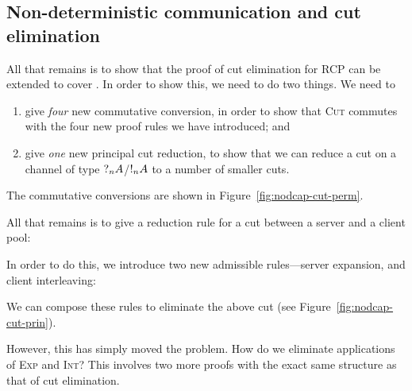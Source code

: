 \documentclass[a4paper,UKenglish]{lipics-v2016}
\begin{document}
\subsection*{Non-deterministic communication and cut elimination}
All that remains is to show that the proof of cut elimination for RCP can be
extended to cover \nodcap. In order to show this, we need to do two things.
We need to
\begin{enumerate}
\item
  give \emph{four} new commutative conversion, in order to show that
  \textsc{Cut} commutes with the four new proof rules we have introduced; and
\item
  give \emph{one} new principal cut reduction, to show that we can reduce a cut
  on a channel of type $\give[n]{A}$/$\take[n]{A}$ to a number of smaller cuts.
\end{enumerate}
The commutative conversions are shown in Figure~\ref{fig:nodcap-cut-perm}.
%

%
All that remains is to give a reduction rule for a cut between a server and a
client pool:  
\begin{prooftree}
\end{prooftree}
In order to do this, we introduce two new admissible rules---server expansion,
and client interleaving:
\begin{center}
  \begin{scprooftree*}[0.90]
  \end{scprooftree*}%
  \begin{scprooftree*}[0.90]
  \end{scprooftree*}
\end{center}
We can compose these rules to eliminate the above cut (see
Figure~\ref{fig:nodcap-cut-prin}). 
%

%
However, this has simply moved the problem. How do we eliminate applications of
\textsc{Exp} and \textsc{Int}? This involves two more proofs with the exact same
structure as that of cut elimination. 
\end{document}
